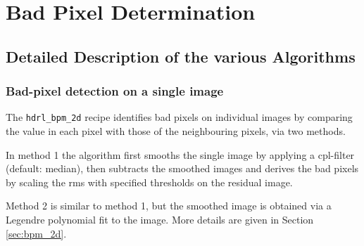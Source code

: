 \section{Bad Pixel Determination}
\label{chap:algorithms:bpm}

\subsection{Detailed Description of the various Algorithms}

%
%
%
%
%

\subsubsection{Bad-pixel detection on a single image}

The {\tt hdrl\_bpm\_2d} recipe identifies bad pixels on individual
images by comparing the value in each pixel with those of the
neighbouring pixels, via two methods.

In method 1 the algorithm first smooths the single image by applying
a cpl-filter (default: median), then subtracts the smoothed images and
derives the bad pixels by scaling the rms with specified thresholds on
the residual image.

Method 2 is similar to method 1, but the smoothed image is obtained
via a Legendre polynomial fit to the image.  More details are given in
Section \ref{sec:bpm_2d}.


